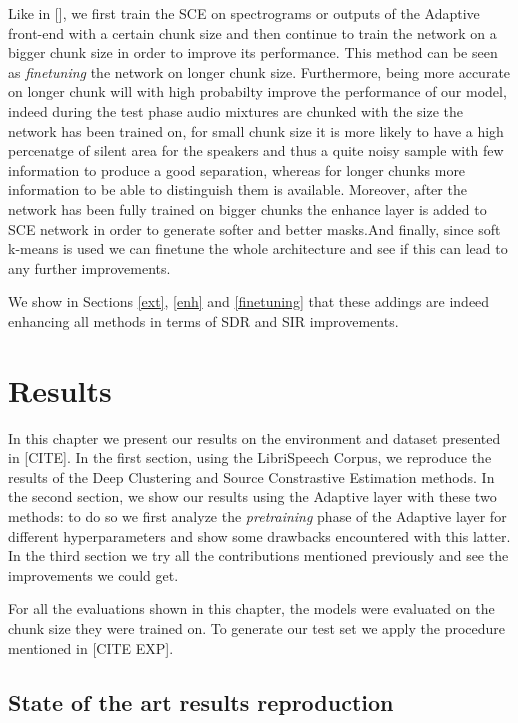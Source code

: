 \documentclass[master, tikz, final,11pt, dvipdfmx]{iscs-thesis}
\begin{document}
Like in [], we first train the SCE on spectrograms or outputs of the Adaptive front-end with a certain chunk size and then continue to train the network on a bigger chunk size in order to improve its performance. This method can be seen as \textit{finetuning} the network on longer chunk size. Furthermore, being more accurate on longer chunk will with high probabilty improve the performance of our model, indeed during the test phase audio mixtures are chunked with the size the network has been trained on, for small chunk size it is more likely to have a high percenatge of silent area for the speakers and thus a quite noisy sample with few information to produce a good separation, whereas for longer chunks more information to be able to distinguish them is available.
Moreover, after the network has been fully trained on bigger chunks the enhance layer is added to SCE network in order to generate softer and better masks.And finally, since soft k-means is used we can finetune the whole architecture and see if this can lead to any further improvements.

We show in Sections \ref{ext}, \ref{enh} and \ref{finetuning} that these addings are indeed enhancing all methods in terms of SDR and SIR improvements.


\chapter{Results}
\label{res}

In this chapter we present our results on the environment and dataset presented in [CITE].
In the first section, using the LibriSpeech Corpus, we reproduce the results of the Deep Clustering and Source Constrastive Estimation methods. In the second section, we show our results using the Adaptive layer with these two methods: to do so we first analyze the \textit{pretraining} phase of the Adaptive layer for different hyperparameters and show some drawbacks encountered with this latter. In the third section we try all the contributions mentioned previously and see the improvements we could get.

For all the evaluations shown in this chapter, the models were evaluated on the chunk size they were trained on. To generate our test set we apply the procedure mentioned in [CITE EXP].
 
\section{State of the art results reproduction}
\end{document}

